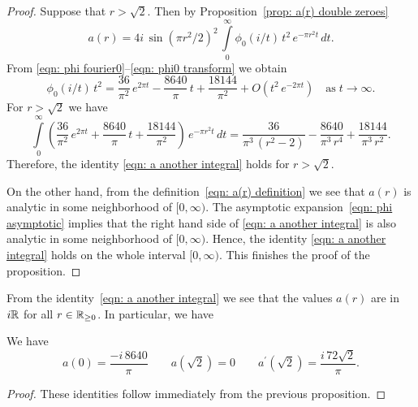 \begin{proof}
Suppose that $r>\sqrt{2}$. Then by Proposition~\ref{prop: a(r) double zeroes}
$$a(r)=4i\,\sin(\pi r^2/2)^2\,\int\limits_{0}^{\infty}\phi_0(i/t)\,t^2\,e^{-\pi r^2 t}\,dt. $$
From \eqref{eqn: phi fourier0}--\eqref{eqn: phi0 transform} we obtain
\begin{equation}\label{eqn: phi asymptotic}
\phi_0(i/t)\,t^2=\frac{36}{\pi^2}\,e^{2 \pi t}-\frac{8640}{\pi}\,t+\frac{18144}{\pi^2}+O(t^2\,e^{-2\pi t})\quad\mbox{as}\;t\to\infty.
\end{equation}
For $r>\sqrt{2}$ we have
\begin{equation}
\int\limits_0^\infty \left(\frac{36}{\pi^2}\,e^{2 \pi t}+\frac{8640}{\pi}\,t+\frac{18144}{\pi^2}\right)\,e^{-\pi r^2 t}\,dt
=\frac{36}{\pi^3\,(r^2-2)}-\frac{8640}{\pi^3\,r^4}+\frac{18144}{\pi^3\,r^2}.\end{equation}
Therefore, the identity \eqref{eqn: a another integral} holds for $r>\sqrt{2}$.

On the other hand, from the definition~\eqref{eqn: a(r) definition} we see that $a(r)$ is analytic in some neighborhood of $[0,\infty)$. The asymptotic expansion~\eqref{eqn: phi asymptotic} implies that the right hand side of \eqref{eqn: a another integral} is also analytic in some neighborhood of $[0,\infty)$. Hence, the identity \eqref{eqn: a another integral} holds on the whole interval $[0,\infty)$. This finishes the proof of the proposition.
\end{proof}
From the identity~\eqref{eqn: a another integral} we see that the values $a(r)$ are in $i\mathbb{R}$ for all $r\in\mathbb{R}_{\geq0}$. In particular, we have
\begin{proposition}\label{prop: a values}
We have
\begin{equation}
a(0)=\frac{-i\,8640}{\pi}\qquad
a(\sqrt{2})=0\qquad
a^\prime(\sqrt{2})=\frac{i\,72\sqrt{2}}{\pi}.
\end{equation}
\end{proposition}
\begin{proof}
These identities follow immediately from the previous proposition.
\end{proof}

